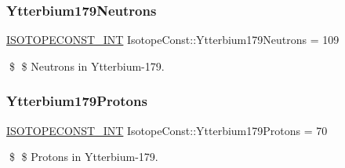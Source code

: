 \subsubsection{\texorpdfstring{Ytterbium179\+Neutrons}{Ytterbium179Neutrons}}
{\footnotesize\ttfamily \mbox{\hyperlink{group___isotope_const-_macros_ga5f18360b3e99483a35c32d789e62621c}{I\+S\+O\+T\+O\+P\+E\+C\+O\+N\+S\+T\+\_\+\+I\+NT}} Isotope\+Const\+::\+Ytterbium179\+Neutrons = 109}

\$ \$ Neutrons in Ytterbium-\/179. \mbox{\label{group___isotope_const-_ytterbium-_yb179_ga3539f4c91c83768dc3e0a896de61ffec}} 
\subsubsection{\texorpdfstring{Ytterbium179\+Protons}{Ytterbium179Protons}}
{\footnotesize\ttfamily \mbox{\hyperlink{group___isotope_const-_macros_ga5f18360b3e99483a35c32d789e62621c}{I\+S\+O\+T\+O\+P\+E\+C\+O\+N\+S\+T\+\_\+\+I\+NT}} Isotope\+Const\+::\+Ytterbium179\+Protons = 70}

\$ \$ Protons in Ytterbium-\/179. 